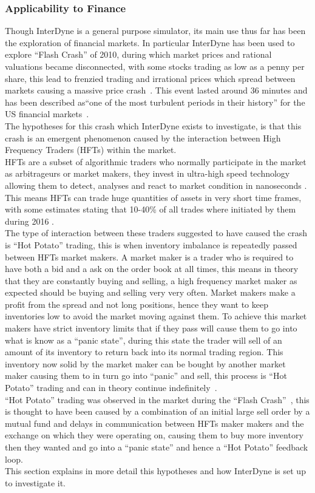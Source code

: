 \documentclass{article}
\begin{document}
\subsubsection{Applicability to Finance}
Though InterDyne is a general purpose simulator, its main use thus far has been the exploration of financial markets. In particular InterDyne has been used to explore ``Flash Crash'' of 2010, during which market prices and rational valuations became disconnected, with some stocks trading as low as a penny per share, this lead to frenzied trading and irrational prices which spread between markets causing a massive price crash~\cite{SECreport_delays}. This event lasted around 36 minutes and has been described as``one of the most turbulent periods in their history'' for the US financial markets~\cite{Impact_hft}.\\
The hypotheses for this crash which InterDyne exists to investigate, is that this crash is an emergent phenomenon caused by the interaction between High Frequency Traders (HFTs) within the market.\\
HFTs are a subset of algorithmic traders who normally participate in the market as arbitrageurs or market makers, they invest in ultra-high speed technology allowing them to detect, analyses and react to market condition in nanoseconds \cite{hftinformation1}. This means HFTs can trade huge quantities of assets in very short time frames, with some estimates stating that 10-40\% of all trades where initiated by them during 2016 \cite{hftmarketparticipation}.\\
The type of interaction between these traders suggested to have caused the crash is ``Hot Potato'' trading, this is when inventory imbalance is repeatedly passed between HFTs market makers. A market maker is a trader who is required to have both a bid and a ask on the order book at all times, this means in theory that they are constantly buying and selling, a high frequency market maker as expected should be buying and selling very very often. Market makers make a profit from the spread and not long positions, hence they want to keep inventories low to avoid the market moving against them. To achieve this market makers have strict inventory limits that if they pass will cause them to go into what is know as a ``panic state'', during this state the trader will sell of an amount of its inventory to return back into its normal trading region. This inventory now solid by the market maker can be bought by another market maker causing them to in turn go into ``panic'' and sell, this process is ``Hot Potato'' trading and can in theory continue indefinitely~\cite{Elias_Paper}.\\
``Hot Potato'' trading was observed in the market during the ``Flash Crash''~\cite{SECreport_delays}, this is thought to have been caused by a combination of an initial large sell order by a mutual fund and delays in communication between HFTs maker makers and the exchange on which they were operating on, causing them to buy more inventory then they wanted and go into a ``panic state'' and hence a ``Hot Potato'' feedback loop.\\       %
This section explains in more detail this hypotheses and how InterDyne is set up to investigate it.  
\end{document}
